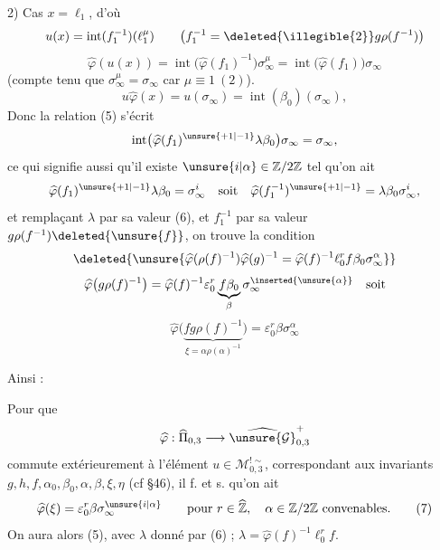2) Cas $x=\ell_1$, d'où
\[
u(x)=\operatorname{int}(f_1^{-1})(\ell_1^\mu)
\qquad\bigl(f_1^{-1}=\deleted{\illegible{2}}g\rho(f^{-1})\bigr)
\]
\[
\widehat\varphi(u(x))=\operatorname{int}\bigl(\widehat\varphi(f_1)^{-1}\bigr)\sigma_\infty^\mu=\operatorname{int}\bigl(\widehat\varphi(f_1)\bigr)\sigma_\infty
\]
(compte tenu que $\sigma_\infty^\mu=\sigma_\infty$ car $\mu\equiv1\ (2)$).
\[
u\widehat\varphi(x)=u(\sigma_\infty)=\operatorname{int}(\beta_0)(\sigma_\infty),
\]
Donc la relation (5) s'écrit
\[
\operatorname{int}\bigl(\widehat\varphi(f_1)^{\unsure{+1|-1}}\lambda\beta_0\bigr)\sigma_\infty=\sigma_\infty,
\]
ce qui signifie aussi qu'il existe $\unsure{i|\alpha}\in\mathbb Z/2\mathbb Z$ tel qu'on ait
\[
\widehat\varphi(f_1)^{\unsure{+1|-1}}\lambda\beta_0=\sigma_\infty^i
\quad\text{soit}\quad
\widehat\varphi(f_1^{-1})^{\unsure{+1|-1}}=\lambda\beta_0\sigma_\infty^i,
\]
et remplaçant $\lambda$ par sa valeur (6), et $f_1^{-1}$ par sa valeur $g\rho(f^{-1})\deleted{\unsure{f}}$, on trouve la condition
\[
\deleted{\unsure{\widehat\varphi(\rho(f)^{-1})\widehat\varphi(g)^{-1}=\widehat\varphi(f)^{-1}\ell_0^r f\beta_0\sigma_\infty^\alpha}}
\]
\[
\widehat\varphi\bigl(g\rho(f)^{-1}\bigr)=\widehat\varphi(f)^{-1}\varepsilon_0^r\underbrace{f\beta_0}_{\beta}\sigma_\infty^{\inserted{\unsure{\alpha}}}\quad\text{soit}
\]
\[
\widehat\varphi\bigl(\underbrace{fg\rho(f)^{-1}}_{\xi=\alpha\rho(\alpha)^{-1}}\bigr)=\varepsilon_0^r\beta\sigma_\infty^\alpha
\]


Ainsi :

\uline{} Pour que
\[
\widehat\varphi:\widehat\Pi_{0,3}\longrightarrow
\widehat{\unsure{\mathcal G}}_{0,3}^{+}
\]
commute extérieurement à l'élément
$u\in\mathcal M_{0,3}^{!\sim}$, correspondant aux invariants
$g,h,f,\alpha_0,\beta_0,\alpha,\beta,\xi,\eta$ (cf \S 46),
il f. et s. qu'on ait
\[
\widehat\varphi(\xi)=\varepsilon_0^r\beta\sigma_\infty^{\unsure{i|\alpha}}
\qquad\text{pour }r\in\widehat{\mathbb Z},\quad
\alpha\in\mathbb Z/2\mathbb Z\ \text{convenables}.
\tag{7}
\]
On aura alors (5), avec 
$\lambda$ donné par (6) ;
$\lambda=\widehat\varphi(f)^{-1}\ell_0^r f$.

